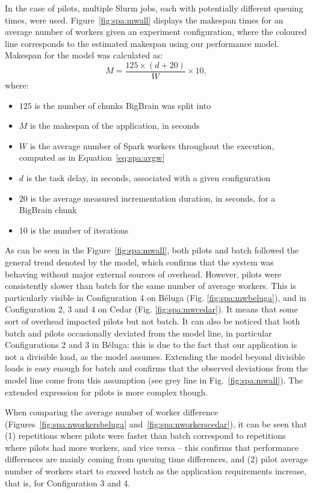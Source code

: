     
    In the case of pilots, multiple Slurm jobs, each with potentially different
    queuing times, were used. Figure~\ref{fig:spa:mwall} displays the makespan
    times for an average number of workers given an experiment configuration,
    where the coloured line corresponds to the estimated makespan using our
    performance model. Makespan for the model was calculated as:
    $$
    M = \frac{125\times(d + 20)}{W}\times 10,
    $$
    where:
    \begin{itemize}
	\item $125$ is the number of chunks BigBrain was split into
	\item $M$ is the makespan of the application, in seconds
	\item $W$ is the average number of Spark workers throughout the
	execution, computed as in Equation~\ref{eq:spa:avgw}
	\item $d$ is the task delay, in seconds, associated with a given
	configuration
	\item $20$ is the average measured incrementation duration, in seconds,
	for a BigBrain chunk
	\item $10$ is the number of iterations
    \end{itemize}
    As can be seen in the Figure~\ref{fig:spa:mwall}, both pilots and batch
    followed the general trend denoted by the model, which confirms that the
    system was behaving without major external sources of overhead. However,
    pilots were consistently slower than batch for the same number of average
    workers. This is particularly visible in Configuration 4 on B\'eluga (Fig.
    \ref{fig:spa:mwbeluga}), and in Configuration 2, 3 and 4 on Cedar (Fig.
    \ref{fig:spa:mwcedar}). It means that some sort of overhead impacted pilots
    but not batch. It can also be noticed that both batch and pilots
    occasionally deviated from the model line, in particular Configurations 2
    and 3 in B\'eluga: this is due to the fact that our application is not a
    divisible load, as the model assumes. Extending the model beyond divisible
    loads is easy enough for batch and confirms that the observed deviations
    from the model line come from this assumption (see grey line in
    Fig.~\ref{fig:spa:mwall}). The extended expression for pilots is more
    complex though.
    
    When comparing the average number of worker difference
    (Figures~\ref{fig:spa:nworkersbeluga} and~\ref{fig:spa:nworkerscedar}), it
    can be seen that (1) repetitions where pilots were faster than batch
    correspond to repetitions where pilots had more workers, and vice versa --
    this confirms that performance differences are mainly coming from queuing
    time differences, and (2) pilot average number of workers start to exceed
    batch as the application requirements increase, that is, for Configuration 3
    and 4.
    
